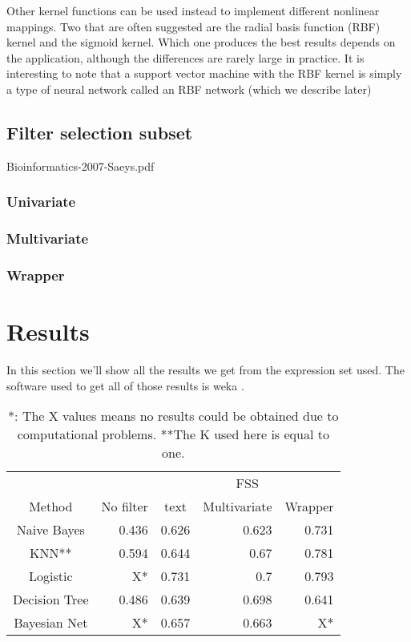 \documentclass[conference,a4paper]{IEEEtran}
\begin{document}
Other kernel functions can be used instead to implement different nonlinear mappings. Two that are often suggested are the radial basis function (RBF) kernel and the sigmoid kernel. Which one produces the best results depends on the application, although the differences are rarely large in practice. It is interesting to note that a support vector machine with the RBF kernel is simply a type of neural network called an RBF network (which we describe later)

\subsection{Filter selection subset}

Bioinformatics-2007-Saeys.pdf

\subsubsection{Univariate}

\subsubsection{Multivariate}

\subsubsection{Wrapper}

\section{Results}


In this section we'll show all the results we get from the expression set used. The software used to get all of those results is weka \cite{weka}. 

\begin{table}[h]
\caption{*: The X values means no results could be obtained due to computational problems. **The K used here is equal to one.}
\centering
\begin{tabular}{c r r r r}
\hline\hline
 & & \multicolumn{3}{|c}{FSS} \\
Method & No filter & \multicolumn{1}{|c}{text}Univariate & Multivariate & Wrapper\\ [0.2ex]
\hline
Naive Bayes & 0.436 & 0.626 & 0.623 & 0.731 \\
KNN** & 0.594 & 0.644 & 0.67 & 0.781 \\
Logistic &  X* & 0.731 & 0.7 & 0.793\\
Decision Tree & 0.486 & 0.639 & 0.698 & 0.641\\
Bayesian Net & X* & 0.657 & 0.663 & X* \\ [1ex]
\hline
\end{tabular}
\label{table:basicsResults}
\end{table}
\end{document}
